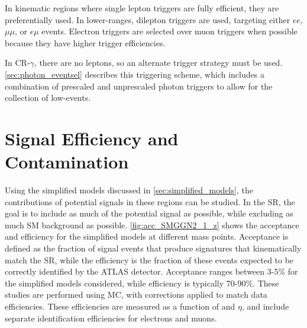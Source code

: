 In kinematic regions where single lepton triggers are fully efficient, they are preferentially used. In lower-\pt ranges, dilepton triggers are used, targeting either $ee$, $\mu\mu$, or $e\mu$ events. Electron triggers are selected over muon triggers when possible because they have higher trigger efficiencies.

In CR-$\gamma$, there are no leptons, so an alternate trigger strategy must be used. \autoref{sec:photon_eventsel} describes this triggering scheme, which includes a combination of prescaled and unprescaled photon triggers to allow for the collection of low-\pt \gjets events. 


\section{Signal Efficiency and Contamination}

Using the simplified models discussed in \autoref{sec:simplified_models}, the contributions of potential signals in these regions can be studied. In the \ac{SR}, the goal is to include as much of the potential signal as possible, while excluding as much \ac{SM} background as possible. \autoref{fig:acc_SMGGN2_1_z} shows the acceptance and efficiency for the simplified models at different mass points. Acceptance is defined as the fraction of signal events that produce signatures that kinematically match the \ac{SR}, while the efficiency is the fraction of these events expected to be correctly identified by the \ac{ATLAS} detector. Acceptance ranges between 3-5\% for the simplified models considered, while efficiency is typically 70-90\%. These studies are performed using \ac{MC}, with corrections applied to match data efficiencies. These efficiencies are measured as a function of \pt and $\eta$, and include separate identification efficiencies for electrons and muons. 

